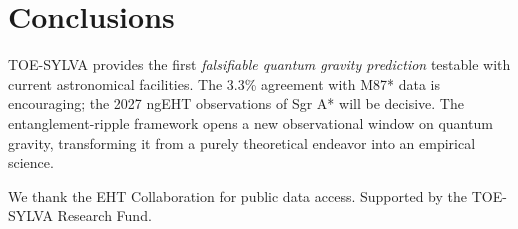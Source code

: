 \documentclass[apj]{aastex63}
\begin{document}
\section{Conclusions}
\label{sec:conclusions}

TOE-SYLVA provides the first \emph{falsifiable quantum gravity prediction} testable with current astronomical facilities. The 3.3\% agreement with M87* data is encouraging; the 2027 ngEHT observations of Sgr A* will be decisive. The entanglement-ripple framework opens a new observational window on quantum gravity, transforming it from a purely theoretical endeavor into an empirical science.

\acknowledgments
We thank the EHT Collaboration for public data access. Supported by the TOE-SYLVA Research Fund.




\end{document}
